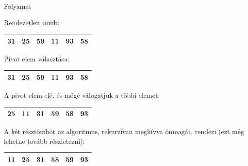 \documentclass[hungarian]{beamer}
\begin{document}
\begin{frame}{Folyamat}

Rendezetlen tömb:

\begin{tabular}{|c|c|c|c|c|c|}
    \hline
    31 & 25 & 59 & 11 & 93 & 58 \\
    \hline
\end{tabular}

\vspace{5mm}

Pivot elem választása:

\begin{tabular}{|c||c|c|c|c|c|}
    \hline
    31 & 25 & 59 & 11 & 93 & 58 \\
    \hline
\end{tabular}

\vspace{5mm}

A pivot elem elé, és mögé válogatjuk a többi elemet:

\begin{tabular}{|c|c||c||c|c|c|}
    \hline
    25 & 11 & 31 & 59 & 58 & 93 \\
    \hline
\end{tabular}

\vspace{5mm}

A két résztömböt az algoritmus, rekurzívan meghívva önmagát, rendezi (ezt még lehetne tovább részletezni):

\begin{tabular}{|c|c||c||c|c|c|}
    \hline
    11 & 25 & 31 & 58 & 59 & 93 \\
    \hline
\end{tabular}

\end{frame}
\end{document}
